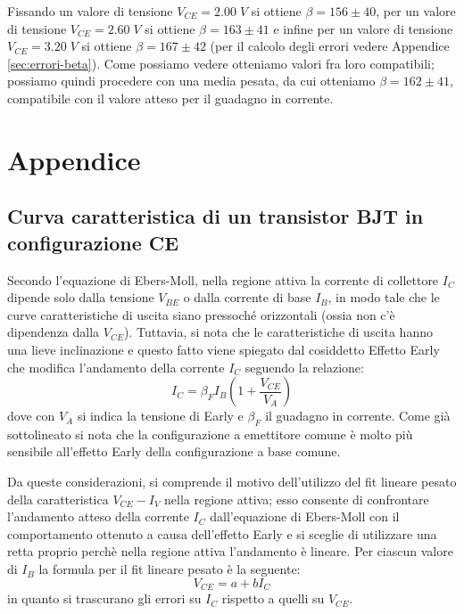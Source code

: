 \documentclass[a4paper, 11pt]{article}
\begin{document}
Fissando un valore di tensione $V_{CE} = 2.00 \; V$ si ottiene $\beta = 156 \pm 40$, per un valore di tensione $V_{CE} = 2.60 \; V$ si ottiene $\beta = 163 \pm 41$ e infine per un valore di tensione $V_{CE} = 3.20 \; V$ si ottiene $\beta = 167 \pm 42$ (per il calcolo degli errori vedere Appendice \ref{sec:errori-beta}). Come possiamo vedere otteniamo valori fra loro compatibili; possiamo quindi procedere con una media pesata, da cui otteniamo $\beta = 162 \pm 41$, compatibile con il valore atteso per il guadagno in corrente. 

\newpage

\section{Appendice}

\subsection{Curva caratteristica di un transistor BJT in configurazione CE} \label{sec:curva-caratteristica-transistor}
Secondo l'equazione di Ebers-Moll, nella regione attiva la corrente di collettore $I_C$ dipende solo dalla tensione $V_{BE}$ o dalla corrente di base $I_B$, in modo tale che le curve caratteristiche di uscita siano pressoché orizzontali (ossia non c'è dipendenza dalla $V_{CE}$). Tuttavia, si nota che le caratteristiche di uscita hanno una lieve inclinazione e questo fatto viene spiegato dal cosiddetto Effetto Early che modifica l'andamento della corrente $I_C$ seguendo la relazione:
\begin{equation}
    I_C = \beta_F I_B (1 + \frac{V_{CE}}{V_A})
\end{equation}
dove con $V_A$ si indica la tensione di Early e $\beta_F$ il guadagno in corrente. Come già sottolineato si nota che la configurazione a emettitore comune è molto più sensibile all’effetto Early della configurazione a base comune.

Da queste considerazioni, si comprende il motivo dell'utilizzo del fit lineare pesato della caratteristica $V_{CE}-I_V$ nella regione attiva; esso consente di confrontare l'andamento atteso della corrente $I_C$ dall'equazione di Ebers-Moll con il comportamento ottenuto a causa dell'effetto Early e si sceglie di utilizzare una retta proprio perchè nella regione attiva l'andamento è lineare. 
Per ciascun valore di $I_B$ la formula per il fit lineare pesato è la seguente:
\begin{equation} \label{eq:caratteristica I-V}
    V_{CE} = a + bI_C
\end{equation}
in quanto si trascurano gli errori su $I_C$ rispetto a quelli su $V_{CE}$.
\end{document}
